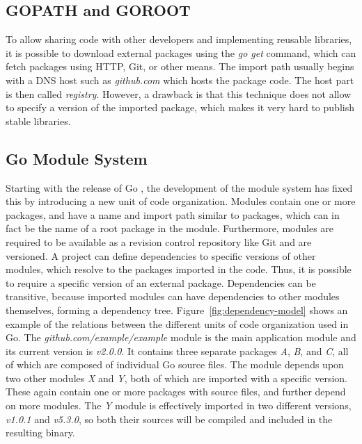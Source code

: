 
\subsection{GOPATH and GOROOT}\label{subsec:background:dependencies:gopath}

To allow sharing code with other developers and implementing reusable libraries, it is possible to download external
packages using the \textit{go get} command, which can fetch packages using \acrshort{HTTP}, Git, or other means.
The import path usually begins with a \acrshort{DNS} host such as \textit{github.com} which hosts the package code.
The host part is then called \textit{registry}.
However, a drawback is that this technique does not allow to specify a version of the imported package, which makes it
very hard to publish stable libraries.




\subsection{Go Module System}\label{subsec:background:dependencies:modules}

Starting with the release of Go , the development of the module system has fixed this by introducing a
new unit of code organization.
Modules contain one or more packages, and have a name and import path similar to packages, which can in fact be the name
of a root package in the module.
Furthermore, modules are required to be available as a revision control repository like Git and are versioned.
A project can define dependencies to specific versions of other modules, which resolve to the packages imported in the
code.
Thus, it is possible to require a specific version of an external package.
Dependencies can be transitive, because imported modules can have dependencies to other modules themselves,
forming a dependency tree.
Figure~\ref{fig:dependency-model} shows an example of the relations between the different units of code organization
used in Go.
The \textit{github.com/example/example} module is the main application module and its current version is
\textit{v2.0.0}.
It contains three separate packages \textit{A}, \textit{B}, and \textit{C}, all of which are composed of individual Go
source files.
The module depends upon two other modules \textit{X} and \textit{Y}, both of which are imported with a specific version.
These again contain one or more packages with source files, and further depend on more modules.
The \textit{Y} module is effectively imported in two different versions, \textit{v1.0.1} and \textit{v5.3.0}, so both
their sources will be compiled and included in the resulting binary.

